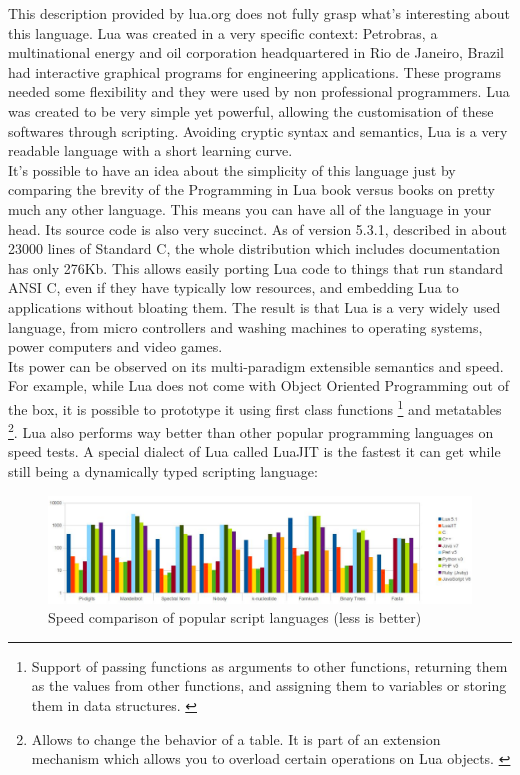 \documentclass{article}
\begin{document}
This description provided by lua.org does not fully grasp what's interesting about this language. Lua was created in a very specific context: Petrobras, a multinational energy and oil corporation headquartered in Rio de Janeiro, Brazil had interactive graphical programs for engineering applications. These programs needed some flexibility and they were used by non professional programmers. Lua was created to be very simple yet powerful, allowing the customisation of these softwares through scripting. Avoiding cryptic syntax and semantics, Lua is a very readable language with a short learning curve. \\

It's possible to have an idea about the simplicity of this language just by comparing the brevity of the Programming in Lua book versus books on pretty much any other language. This means you can have all of the language in your head. Its source code is also very succinct. As of version 5.3.1, described in about 23000 lines of Standard C, the whole distribution which includes documentation has only 276Kb. This allows easily porting Lua code to things that run standard ANSI C, even if they have typically low resources, and embedding Lua to applications without bloating them. The result is that Lua is a very widely used language, from micro controllers and washing machines to operating systems, power computers and video games.\\

Its power can be observed on its multi-paradigm extensible semantics and speed. For example, while Lua does not come with Object Oriented Programming out of the box, it is possible to prototype it using first class functions \footnote{Support of passing functions as arguments to other functions, returning them as the values from other functions, and assigning them to variables or storing them in data structures. \autocite{wikifunc}} and metatables \footnote{Allows to change the behavior of a table. It is part of an extension mechanism which allows you to overload certain operations on Lua objects. \autocite{luausersmeta} \autocite[117]{pil}}. Lua also performs way better than other popular programming languages on speed tests. A special dialect of Lua called LuaJIT is the fastest it can get while still being a dynamically typed scripting language\autocite[8]{modlua}: \\

\begin{figure}[h]
\includegraphics[scale=0.4]{speed.png}
\caption{\label{fig:speedcomparison} Speed comparison of popular script languages (less is better)}
\end{figure}
\end{document}
